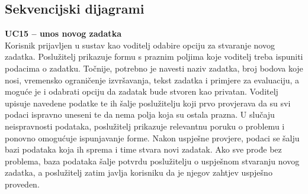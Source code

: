 			\subsection{Sekvencijski dijagrami}
				
%				


				\noindent \textbf{UC15 – unos novog zadatka}\\
				
				\noindent Korisnik prijavljen u sustav kao voditelj odabire opciju za stvaranje novog zadatka. Poslužitelj prikazuje formu s praznim poljima koje voditelj treba ispuniti podacima o zadatku. Točnije, potrebno je navesti naziv zadatka, broj bodova koje nosi, vremensko ograničenje izvršavanja, tekst zadatka i primjere za evaluaciju, a moguće je i odabrati opciju da zadatak bude stvoren kao privatan. Voditelj upisuje navedene podatke te ih šalje poslužitelju koji prvo provjerava da su svi podaci ispravno uneseni te da nema polja koja su ostala prazna. U slučaju neispravnosti podataka, poslužitelj prikazuje relevantnu poruku o problemu i ponovno omogućuje ispunjavanje forme. Nakon uspješne provjere, podaci se šalju bazi podataka koja ih sprema i time stvara novi zadatak. Ako sve prođe bez problema, baza podataka šalje potvrdu poslužitelju o uspješnom stvaranju novog zadatka, a poslužitelj zatim javlja korisniku da je njegov zahtjev uspješno proveden.
				
